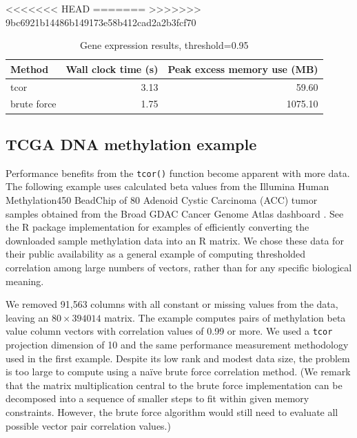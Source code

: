 \documentclass{article}
\let\proglang=\textsf
\numberwithin{algorithmctr}{section}
\begin{document}
<<<<<<< HEAD
=======
>>>>>>> 9bc6921b14486b149173e58b412cad2a2b3fcf70
\begin{table}[ht]
\centering
\begingroup\small
\begin{tabular}{lrr}
  \hline
Method & Wall clock time (s) & Peak excess memory use (MB) \\ 
  \hline
tcor & 3.13 & 59.60 \\ 
  brute force & 1.75 & 1075.10 \\ 
   \hline
\end{tabular}
\endgroup
\caption{Gene expression results, threshold=0.95} 
\label{EisenYeast}
\end{table}

\subsection{TCGA DNA methylation example}

Performance benefits from the {\tt tcor()} function become apparent with more
data.  The following example uses calculated beta values from the Illumina
Human Methylation450 BeadChip of 80 Adenoid Cystic Carcinoma (ACC) tumor
samples obtained from the Broad GDAC Cancer Genome Atlas dashboard \cite{gdac}.
See the \proglang{R} package implementation \cite{sup} for examples of
efficiently converting the downloaded sample methylation data into an R matrix.
We chose these data for their public availability as a general example of
computing thresholded correlation among large numbers of vectors,
rather than for any specific biological meaning.

We removed 91,563 columns with all constant or missing values from the data,
leaving an $80\times 394014$ matrix. The example computes pairs of methylation
beta value column vectors with correlation values of 0.99 or more. We used a
{\tt tcor} projection dimension of 10 and the same performance measurement
methodology used in the first example. Despite its low rank and modest data
size, the problem is too large to compute using a na\"ive brute force
correlation method.  (We remark that the matrix multiplication central to the
brute force implementation can be decomposed into a sequence of smaller steps
to fit within given memory constraints. However, the brute force algorithm
would still need to evaluate all possible vector pair
correlation values.)
\end{document}
